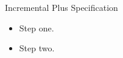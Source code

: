 \documentclass[14pt,t]{beamer}
\begin{document}
\begin{frame}{Incremental Plus Specification}
\begin{itemize}[<+->]
\item Step one.
\item Step two.
\end{itemize}
\end{frame}
\end{document}
